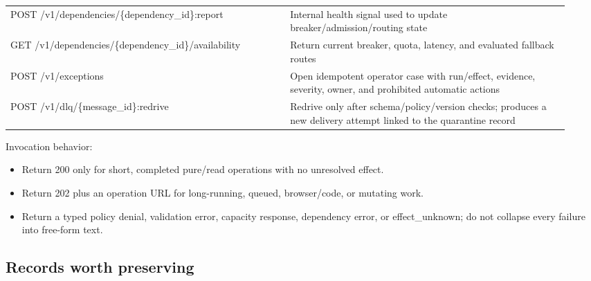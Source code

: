 \begin{longtable}{@{}Y{0.4700\linewidth}Y{0.4700\linewidth}@{}}
POST /v1/dependencies/\{dependency\_id\}:report & Internal health signal used to update breaker/admission/routing state \\
GET /v1/dependencies/\{dependency\_id\}/availability & Return current breaker, quota, latency, and evaluated fallback routes \\
POST /v1/exceptions & Open idempotent operator case with run/effect, evidence, severity, owner, and prohibited automatic actions \\
POST /v1/dlq/\{message\_id\}:redrive & Redrive only after schema/policy/version checks; produces a new delivery attempt linked to the quarantine record \\
\end{longtable}
\BookTableEnd

Invocation behavior:\par

\begin{itemize}

\item Return 200 only for short, completed pure/read operations with no unresolved effect.

\item Return 202 plus an operation URL for long-running, queued, browser/code, or mutating work.

\item Return a typed policy denial, validation error, capacity response, dependency error, or effect\_unknown; do not collapse every failure into free-form text.

\end{itemize}

\subsection{Records worth preserving}

